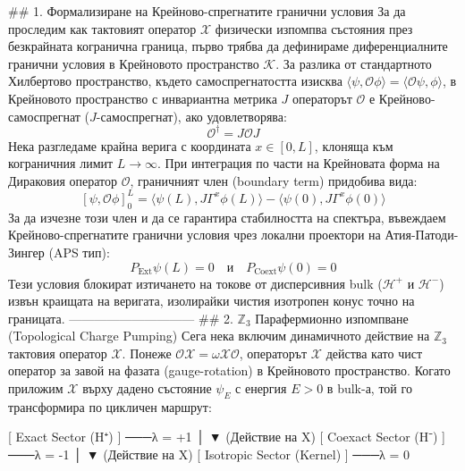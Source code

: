 ## 1. Формализиране на Крейново-спрегнатите гранични условия
За да проследим как тактовият оператор $\mathcal{X}$ физически изпомпва състояния през безкрайната когранична граница, първо трябва да дефинираме диференциалните гранични условия в Крейновото пространство $\mathcal{K}$.
За разлика от стандартното Хилбертово пространство, където самоспрегнатостта изисква $\langle \psi, \mathcal{O} \phi \rangle = \langle \mathcal{O} \psi, \phi \rangle$, в Крейновото пространство с инвариантна метрика $J$ операторът $\mathcal{O}$ е Крейново-самоспрегнат ($J$-самоспрегнат), ако удовлетворява:
$$\mathcal{O}^\dagger = J \mathcal{O} J$$ 
Нека разгледаме крайна верига с координата $x \in [0, L]$, клоняща към кограничния лимит $L \to \infty$. При интеграция по части на Крейновата форма на Дираковия оператор $\mathcal{O}$, граничният член (boundary term) придобива вида:
$$\left[ \psi, \mathcal{O} \phi \right]_0^L = \langle \psi(L), J \Gamma^x \phi(L) \rangle - \langle \psi(0), J \Gamma^x \phi(0) \rangle$$ 
За да изчезне този член и да се гарантира стабилността на спектъра, въвеждаем Крейново-спрегнатите гранични условия чрез локални проектори на Атия-Патоди-Зингер (APS тип):
$$P_{\text{Ext}} \psi(L) = 0 \quad \text{и} \quad P_{\text{Coext}} \psi(0) = 0$$ 
Тези условия блокират изтичането на токове от дисперсивния bulk ($\mathcal{H}^+$ и $\mathcal{H}^-$) извън краищата на веригата, изолирайки чистия изотропен конус точно на границата.
------------------------------
## 2. $\mathbb{Z}_3$ Парафермионно изпомпване (Topological Charge Pumping)
Сега нека включим динамичното действие на $\mathbb{Z}_3$ тактовия оператор $\mathcal{X}$. Понеже $\mathcal{O}\mathcal{X} = \omega \mathcal{X}\mathcal{O}$, операторът $\mathcal{X}$ действа като чист оператор за завой на фазата (gauge-rotation) в Крейновото пространство.
Когато приложим $\mathcal{X}$ върху дадено състояние $\psi_E$ с енергия $E > 0$ в bulk-а, той го трансформира по цикличен маршрут:

               [ Exact Sector (H⁺) ]  ───λ = +1
                         │
                         ▼ (Действие на X)
              [ Coexact Sector (H⁻) ] ───λ = -1
                         │
                         ▼ (Действие на X)
              [ Isotropic Sector (Kernel) ] ───λ = 0

